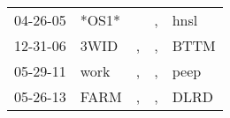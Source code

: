\begin{supertabular}{p{0.07\textwidth}p{0.06\textwidth}p{0.02\textwidth}p{0.02\textwidth}p{0.06\textwidth}}
 04-26-05\textsuperscript{} &                   *OS1* &    &  , &  hnsl\textsuperscript{} \\
 12-31-06\textsuperscript{} &  3WID\textsuperscript{} &  , &  , &  BTTM\textsuperscript{} \\
 05-29-11\textsuperscript{} &  work\textsuperscript{} &  , &  , &  peep\textsuperscript{} \\
 05-26-13\textsuperscript{} &  FARM\textsuperscript{} &  , &  , &  DLRD\textsuperscript{} \\
\end{supertabular}
